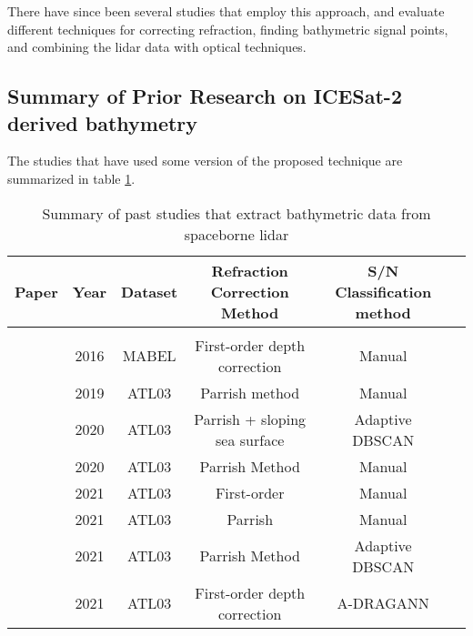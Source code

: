 There have since been several studies that employ this approach, and evaluate different techniques for correcting refraction, finding bathymetric signal points, and combining the lidar data with optical techniques.

\subsection{Summary of Prior Research on ICESat-2 derived bathymetry}

The studies that have used some version of the proposed technique are summarized in table \ref{tab:researchsummary}.

\begin{table}
      \caption{Summary of past studies that extract bathymetric data from spaceborne lidar}
      \label{tab:researchsummary}
      \raggedright
      \begin{tabular}{rccccc}
            \midrule
            Paper                              & Year & Dataset & Refraction Correction Method  & S/N Classification method     \\ 
            \hline                                                                                                              \\
            \citeauthor{Forfinski-Sarkozi2016} & 2016 & MABEL   & First-order depth correction  & Manual                        \\ 
            \citeauthor{Parrish2019}           & 2019 & ATL03   & Parrish method                & Manual                        \\ 
            \citeauthor{Ma2020}                & 2020 & ATL03   & Parrish + sloping sea surface & Adaptive DBSCAN               \\ 
            \citeauthor{Thomas2021d}           & 2020 & ATL03   & Parrish Method                & Manual                        \\ 
            \citeauthor{Albright2021}          & 2021 & ATL03   & First-order                   & Manual                        \\ 
            \citeauthor{Babbel2021a}           & 2021 & ATL03   & Parrish                       & Manual                        \\ 
            \citeauthor{Xie2021}               & 2021 & ATL03   & Parrish Method                & Adaptive DBSCAN               \\ 
            \citeauthor{Cao2021}               & 2021 & ATL03   & First-order depth correction  & A-DRAGANN                     \\ 

\end{tabular}
\end{table}
